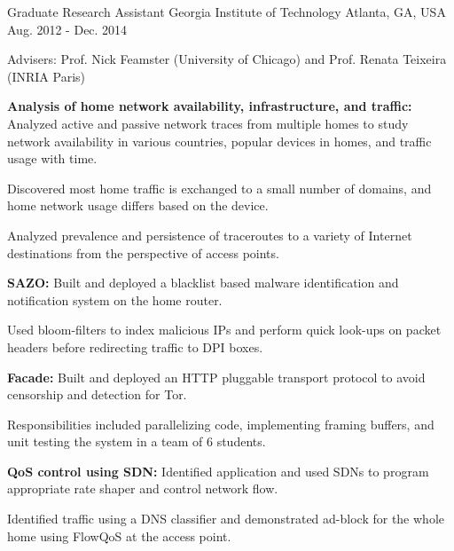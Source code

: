\begin{cventries}
  \cventry
    {Graduate Research Assistant} %
    {Georgia Institute of Technology} %
    {Atlanta, GA, USA} %
    {Aug. 2012 - Dec. 2014} %
    {
      \begin{cvitems} %
      \item {Advisers: Prof. Nick Feamster (University of Chicago) and Prof. Renata Teixeira (INRIA Paris)}
%      
      \item {\textbf{Analysis of home network availability, infrastructure, and traffic:} Analyzed active and passive network traces from multiple homes to study network availability in various countries, popular devices in homes, and traffic usage with time.
      		}
      \item {Discovered most home traffic is exchanged to a small number of domains, and home network usage differs based on the device.}
      \item {Analyzed prevalence and persistence of traceroutes to a variety of Internet destinations from the perspective of access points.}
%     		
      \item {\textbf{SAZO:} Built and deployed a blacklist based malware identification and notification system on the home router.
      		}
      \item {Used bloom-filters to index malicious IPs and perform quick look-ups on packet headers before redirecting traffic to DPI boxes.}
%      
      \item {\textbf{Facade:} Built and deployed an HTTP pluggable transport protocol to avoid censorship and detection for Tor.
      		}
      \item {Responsibilities included parallelizing code, implementing framing buffers, and unit testing the system in a team of 6 students.}
%      
      \item {\textbf{QoS control using SDN:} Identified application and used SDNs to program appropriate rate shaper and control network flow.}
      \item {Identified traffic using a DNS classifier and demonstrated ad-block for the whole home using FlowQoS at the access point.
}
\end{cvitems}}
\end{cventries}

